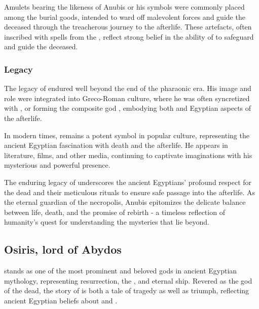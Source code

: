 Amulets bearing the likeness of Anubis or his symbols were commonly placed among the burial goods, intended to ward off malevolent forces and guide the deceased through the treacherous journey to the afterlife. These artefacts, often inscribed with spells from the , reflect strong belief in the ability of  to safeguard and guide the deceased.

\subsubsection*{Legacy}
The legacy of  endured well beyond the end of the pharaonic era. His image and role were integrated into Greco-Roman culture, where he was often syncretized with , or forming the composite god , embodying both  and Egyptian aspects of the afterlife.

In modern times,  remains a potent symbol in popular culture, representing the ancient Egyptian fascination with death and the afterlife. He appears in literature, films, and other media, continuing to captivate imaginations with his mysterious and powerful presence.

The enduring legacy of  underscores the ancient Egyptians' profound respect for the dead and their meticulous rituals to ensure safe passage into the afterlife. As the eternal guardian of the necropolis, Anubis epitomizes the delicate balance between life, death, and the promise of rebirth - a timeless reflection of humanity's quest for understanding the mysteries that lie beyond.

\subsection*{Osiris, lord of Abydos}

 stands as one of the most prominent and beloved gods in ancient Egyptian mythology, representing resurrection, the , and eternal ship. Revered as the god of the dead, the story of  is both a tale of tragedy as well as triumph, reflecting ancient Egyptian beliefs about  and .

